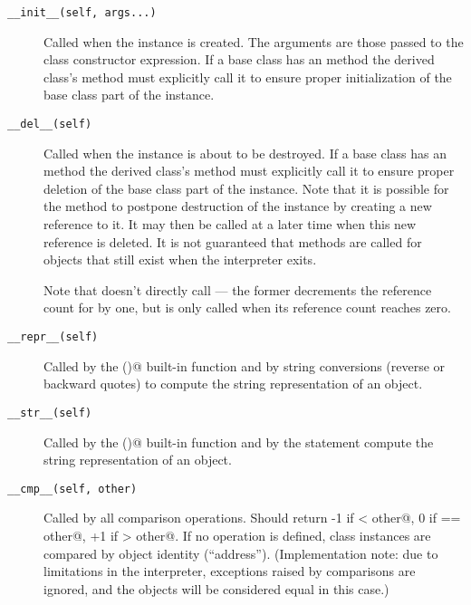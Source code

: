 \begin{description}

\item[{\tt __init__(self, args...)}]
Called when the instance is created.  The arguments are those passed
to the class constructor expression.  If a base class has an
 method the derived class's  method must
explicitly call it to ensure proper initialization of the base class
part of the instance.

\item[{\tt __del__(self)}]
Called when the instance is about to be destroyed.  If a base class
has an  method the derived class's  method
must explicitly call it to ensure proper deletion of the base class
part of the instance.  Note that it is possible for the 
method to postpone destruction of the instance by creating a new
reference to it.  It may then be called at a later time when this new
reference is deleted.  It is not guaranteed that
 methods are called for objects that still exist when
the interpreter exits.

Note that  doesn't directly call  --- the
former decrements the reference count for  by one, but
 is only called when its reference count reaches zero.

\item[{\tt __repr__(self)}]
Called by the \verb@repr()@ built-in function and by string conversions
(reverse or backward quotes) to compute the string representation of an object.

\item[{\tt __str__(self)}]
Called by the \verb@str()@ built-in function and by the \verb@print@
statement compute the string representation of an object.

\item[{\tt __cmp__(self, other)}]
Called by all comparison operations.  Should return -1 if
\verb@self < other@,  0 if \verb@self == other@, +1 if
\verb@self > other@.  If no  operation is defined, class
instances are compared by object identity (``address'').
(Implementation note: due to limitations in the interpreter,
exceptions raised by comparisons are ignored, and the objects will be
considered equal in this case.)


\end{description}
